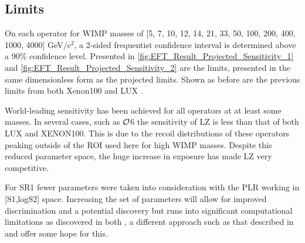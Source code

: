 \subsection{Limits}
\par
On each operator for WIMP masses of [5, 7, 10, 12, 14, 21, 33, 50, 100, 200, 400, 1000, 4000] GeV/c$^2$, a 2-sided frequentist confidence interval is determined above a 90\% confidence level.
Presented in \autoref{fig:EFT_Result_Projected_Sensitivity_1} and \autoref{fig:EFT_Result_Projected_Sensitivity_2} are the limits, presented in the same dimensionless form as the projected limits.
Shown as before are the previous limits from both Xenon100 \cite{xenon100_eft_ref} and LUX \cite{LUX_RUN4_EFT_2021}.


\par
World-leading sensitivity has been achieved for all operators at at least some masses.
In several cases, such as $\operatorname{\mathcal{O}}$6 the sensitivity of LZ is less than that of both LUX and XENON100. 
This is due to the recoil distributions of these operators peaking outside of the ROI used here for high WIMP masses.
Despite this reduced parameter space, the huge increase in exposure has made LZ very competitive.



For SR1 fewer parameters were taken into consideration with the PLR working in [S1,logS2] space.
Increasing the set of parameters will allow for improved discrimination and a potential discovery but runs into significant computational limitations as discovered in both \cite{nicolelarsen_thesis_ref, shaunalsum_thesis_ref, billyboxer_thesis_ref}, a different approach such as that described in \cite{flamenest_ref} and \cite{lux_ml_plr_ref} offer some hope for this.

